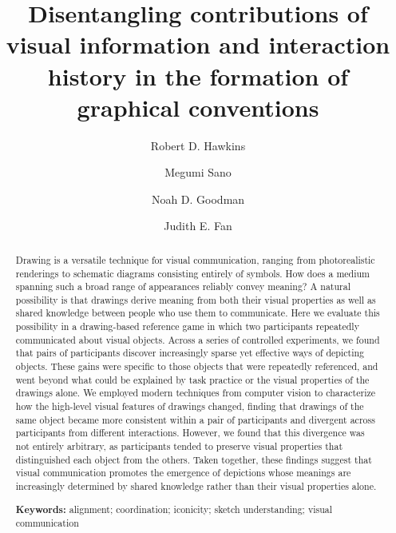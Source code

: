 \documentclass[11pt,letterpaper]{article}
\title{Disentangling contributions of visual information and interaction history in the formation of graphical conventions}
\date{}
\author[a,d]{Robert D. Hawkins}
\author[a]{Megumi Sano}
\author[a,b]{Noah D. Goodman}
\author[a,c]{Judith E. Fan}
\affil[a]{Department of Psychology, Stanford University}
\affil[b]{Department of Computer Science, Stanford University}
\affil[c]{Department of Psychology, University of California, San Diego}
\affil[d]{Department of Psychology, Princeton University}
\begin{document}
\maketitle

\begin{abstract}
Drawing is a versatile technique for visual communication, ranging from photorealistic renderings to schematic diagrams consisting entirely of symbols.
How does a medium spanning such a broad range of appearances reliably convey meaning?
A natural possibility is that drawings derive meaning from both their visual properties as well as shared knowledge between people who use them to communicate.
Here we evaluate this possibility in a drawing-based reference game in which two participants repeatedly communicated about visual objects.
Across a series of controlled experiments, we found that pairs of participants discover increasingly sparse yet effective ways of depicting objects.
These gains were specific to those objects that were repeatedly referenced, and went beyond what could be explained by task practice or the visual properties of the drawings alone.
We employed modern techniques from computer vision to characterize how the high-level visual features of drawings changed, finding that drawings of the same object became more consistent within a pair of participants and divergent across participants from different interactions.
However, we found that this divergence was not entirely arbitrary, as participants tended to preserve visual properties that distinguished each object from the others. 
Taken together, these findings suggest that visual communication promotes the emergence of depictions whose meanings are increasingly determined by shared knowledge rather than their visual properties alone.

\textbf{Keywords:}
alignment; coordination; iconicity; sketch understanding; visual communication


\end{abstract}
\end{document}
